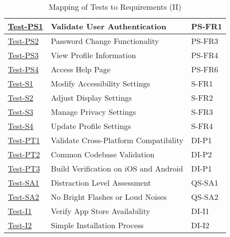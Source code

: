 \documentclass[12pt, titlepage]{article}
\begin{document}
\begin{table}[htpb!]
  \centering
  \begin{tabular}{|l|p{8cm}|p{3cm}|}
    \hline
    \hyperref[itm:Test-PS1]{Test-PS1} & Validate User Authentication          & PS-FR1 \\
    \hline
    \hyperref[itm:Test-PS2]{Test-PS2} & Password Change Functionality         & PS-FR3 \\
    \hline
    \hyperref[itm:Test-PS3]{Test-PS3} & View Profile Information              & PS-FR4 \\
    \hline
    \hyperref[itm:Test-PS4]{Test-PS4} & Access Help Page                      & PS-FR6 \\
    \hline
    \hyperref[itm:Test-S1]{Test-S1}   & Modify Accessibility Settings         & S-FR1  \\
    \hline
    \hyperref[itm:Test-S2]{Test-S2}   & Adjust Display Settings               & S-FR2  \\
    \hline
    \hyperref[itm:Test-S3]{Test-S3}   & Manage Privacy Settings               & S-FR3  \\
    \hline
    \hyperref[itm:Test-S4]{Test-S4}   & Update Profile Settings               & S-FR4  \\
    \hline
    \hyperref[itm:Test-PT1]{Test-PT1} & Validate Cross-Platform Compatibility & DI-P1  \\
    \hline
    \hyperref[itm:Test-PT2]{Test-PT2} & Common Codebase Validation            & DI-P2  \\
    \hline
    \hyperref[itm:Test-PT3]{Test-PT3} & Build Verification on iOS and Android & DI-P1  \\
    \hline
    \hyperref[itm:Test-SA1]{Test-SA1} & Distraction Level Assessment          & QS-SA1 \\
    \hline
    \hyperref[itm:Test-SA2]{Test-SA2} & No Bright Flashes or Loud Noises      & QS-SA2 \\
    \hline
    \hyperref[itm:Test-I1]{Test-I1}   & Verify App Store Availability         & DI-I1  \\
    \hline
    \hyperref[itm:Test-I2]{Test-I2}   & Simple Installation Process           & DI-I2  \\
    \hline
  \end{tabular}
  \caption{Mapping of Tests to Requirements (II)}
  \label{tab:test_requirements2}
\end{table}
\end{document}
